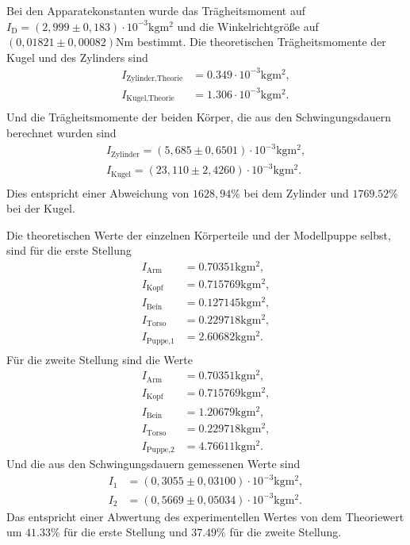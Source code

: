 Bei den Apparatekonstanten wurde das Trägheitsmoment auf \newline
$I_{\text{D}} = (2,999 \pm 0,183) \cdot 10^{-3} \si{\kilogram\meter^2}$ und die
Winkelrichtgröße auf $(0,01821\pm 0,00082) \si{\newton\meter}$ bestimmt.
Die theoretischen Trägheitsmomente der Kugel und des Zylinders sind
\begin{align*}
    I_{\text{Zylinder,Theorie}} &= 0.349 \cdot 10^{-3} \si{\kilogram\meter^2}, \\
    I_{\text{Kugel,Theorie}} &= 1.306 \cdot 10^{-3} \si{\kilogram\meter^2}. \\
\end{align*}
Und die Trägheitsmomente der beiden Körper, die aus den Schwingungsdauern berechnet wurden sind
\begin{align*}
    I_{\text{Zylinder}} = (5,685 \pm 0,6501) \cdot 10^{-3} \si{\kilogram\meter^2}, \\
    I_{\text{Kugel}} = (23,110 \pm 2,4260) \cdot 10^{-3} \si{\kilogram\meter^2}. \\
\end{align*}
Dies entspricht einer Abweichung von $1628,94\%$ bei dem Zylinder und $1769.52\%$ bei der Kugel.

Die theoretischen Werte der einzelnen Körperteile und der Modellpuppe selbst, sind für die erste Stellung
\begin{align*}
    I_{\text{Arm}} &= 0.70351 \si{\kilogram\meter^2}, \\
    I_{\text{Kopf}} &= 0.715769 \si{\kilogram\meter^2}, \\
    I_{\text{Bein}} &= 0.127145 \si{\kilogram\meter^2}, \\
    I_{\text{Torso}} &= 0.229718 \si{\kilogram\meter^2}, \\
    I_{\text{Puppe,1}} &= 2.60682 \si{\kilogram\meter^2}. \\
\end{align*}
Für die zweite Stellung sind die Werte
\begin{align*}
    I_{\text{Arm}} &= 0.70351 \si{\kilogram\meter^2}, \\
    I_{\text{Kopf}} &= 0.715769 \si{\kilogram\meter^2}, \\
    I_{\text{Bein}} &= 1.20679 \si{\kilogram\meter^2}, \\ 
    I_{\text{Torso}} &= 0.229718 \si{\kilogram\meter^2}, \\
    I_{\text{Puppe,2}} &= 4.76611 \si{\kilogram\meter^2}.
\end{align*}
Und die aus den Schwingungsdauern gemessenen Werte sind
\begin{align*}
    I_{1} &= (0,3055\pm 0,03100) \cdot 10^{-3} \si{\kilogram\meter^2}, \\
    I_{2} &= (0,5669\pm 0,05034) \cdot 10^{-3} \si{\kilogram\meter^2}.
\end{align*}
Das entspricht einer Abwertung des experimentellen Wertes von dem Theoriewert um $41.33 \%$ für die erste Stellung und
$37.49 \%$ für die zweite Stellung.

